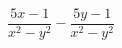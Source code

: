 \begin{ex}
	\begin{condition}
		\( \dfrac{5x-1}{x^2-y^2}-\dfrac{5y-1}{x^2-y^2} \)
	\end{condition}
\end{ex}